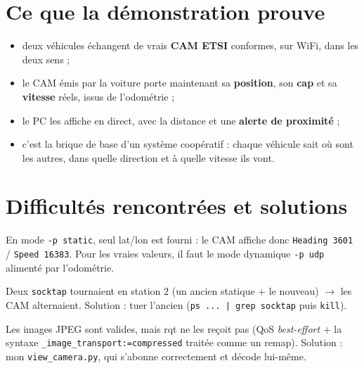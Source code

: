 \documentclass[a4paper,11pt]{article}
\newcommand{\code}[1]{\texttt{#1}}
\begin{document}
\section{Ce que la démonstration prouve}
\begin{itemize}[leftmargin=1.6em]
  \item deux véhicules échangent de vrais \textbf{CAM ETSI} conformes, sur WiFi, dans les deux
        sens ;
  \item le CAM émis par la voiture porte maintenant sa \textbf{position}, son \textbf{cap} et
        sa \textbf{vitesse} réels, issus de l'odométrie ;
  \item le PC les affiche en direct, avec la distance et une \textbf{alerte de proximité} ;
  \item c'est la brique de base d'un système coopératif : chaque véhicule sait où sont les
        autres, dans quelle direction et à quelle vitesse ils vont.
\end{itemize}

\section{Difficultés rencontrées et solutions}

\begin{piege}
En mode \code{-p static}, seul lat/lon est fourni : le CAM affiche donc \code{Heading 3601} /
\code{Speed 16383}. Pour les vraies valeurs, il faut le mode dynamique \code{-p udp} alimenté
par l'odométrie.
\end{piege}

\begin{piege}
Deux \code{socktap} tournaient en station 2 (un ancien statique + le nouveau) $\rightarrow$
les CAM alternaient. Solution : tuer l'ancien (\code{ps ... | grep socktap} puis \code{kill}).
\end{piege}

\begin{piege}
Les images JPEG sont valides, mais rqt ne les reçoit pas (QoS \emph{best-effort} + la syntaxe
\code{\_image\_transport:=compressed} traitée comme un remap). Solution : mon
\code{view\_camera.py}, qui s'abonne correctement et décode lui-même.
\end{piege}
\end{document}
